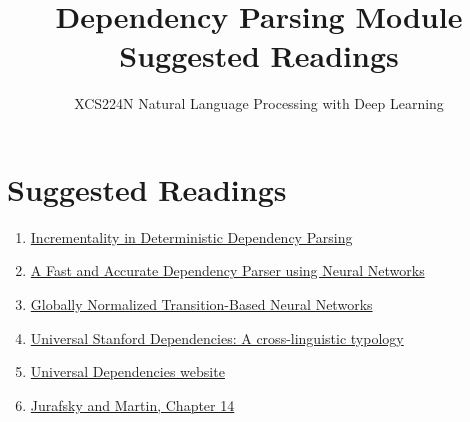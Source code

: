 \documentclass{article}
\title{Dependency Parsing Module Suggested Readings}
\author{XCS224N Natural Language Processing with Deep Learning}
\date{}
\begin{document}
\maketitle

\section{Suggested Readings}
\begin{enumerate}
    \item \href{https://www.aclweb.org/anthology/W04-0308.pdf}{Incrementality in Deterministic Dependency Parsing}
    \item \href{https://www.emnlp2014.org/papers/pdf/EMNLP2014082.pdf}{A Fast and Accurate Dependency Parser using Neural Networks}
    \item \href{https://arxiv.org/pdf/1603.06042.pdf}{Globally Normalized Transition-Based Neural Networks}
    \item \href{https://nlp.stanford.edu/~manning/papers/USD_LREC14_UD_revision.pdf}{Universal Stanford Dependencies: A cross-linguistic typology}
    \item \href{https://universaldependencies.org/}{Universal Dependencies website}
    \item \href{https://web.stanford.edu/~jurafsky/slp3/14.pdf}{Jurafsky and Martin, Chapter 14}
\end{enumerate}
\end{document}
